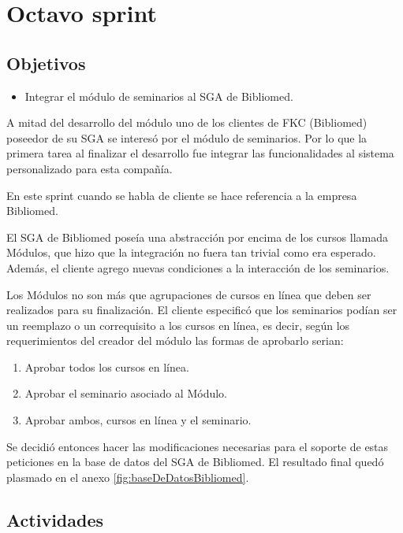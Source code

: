 ﻿\section{Octavo sprint} %
\label{sec:octavo_sprint}

\subsection{Objetivos}

\begin{itemize}
	\item Integrar el módulo de seminarios al SGA de Bibliomed.
\end{itemize}

A mitad del desarrollo del módulo uno de los clientes de FKC (Bibliomed) poseedor de su SGA se interesó por el módulo de seminarios. Por lo que la primera tarea al finalizar el desarrollo fue integrar las funcionalidades al sistema personalizado para esta compañía.

En este sprint cuando se habla de cliente se hace referencia a la empresa Bibliomed.

El SGA de Bibliomed poseía una abstracción por encima de los cursos llamada Módulos, que hizo que la integración no fuera tan trivial como era esperado. Además, el cliente agrego nuevas condiciones a la interacción de los seminarios.

Los Módulos no son más que agrupaciones de cursos en línea que deben ser realizados para su finalización. El cliente especificó que los seminarios podían ser un reemplazo o un correquisito a los cursos en línea, es decir, según los requerimientos del creador del módulo las formas de aprobarlo serian:

\begin{enumerate}
	\item Aprobar todos los cursos en línea.
	\item Aprobar el seminario asociado al Módulo.
	\item Aprobar ambos, cursos en línea y el seminario.
\end{enumerate}

Se decidió entonces hacer las modificaciones necesarias para el soporte de estas peticiones en la base de datos del SGA de Bibliomed. El resultado final quedó plasmado en el anexo \ref{fig:baseDeDatosBibliomed}.

\subsection{Actividades} %
\label{sub:actividades8}

